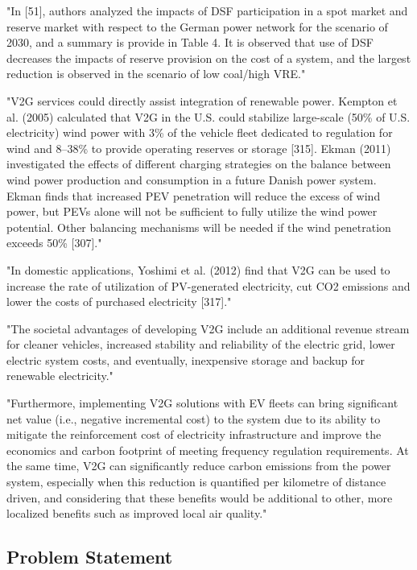 "In [51], authors analyzed the impacts of DSF participation in a spot market and reserve market with respect to the German power network for the scenario of 2030, and a summary is provide in Table 4. It is observed that use of DSF decreases the impacts of reserve provision on the cost of a system, and the largest reduction is observed in the scenario of low coal/high VRE." \cite{kaushik_comprehensive_2022}

"V2G services could directly assist integration of renewable power. Kempton et al. (2005) calculated that V2G in the U.S. could stabilize large-scale (50\% of U.S. electricity) wind power with 3\% of the vehicle fleet dedicated to regulation for wind and 8–38\% to provide operating reserves or storage [315]. Ekman (2011) investigated the effects of different charging strategies on the balance between wind power production and consumption in a future Danish power system. Ekman finds that increased PEV penetration will reduce the excess of wind power, but PEVs alone will not be sufficient to fully utilize the wind power potential. Other balancing mechanisms will be needed if the wind penetration exceeds 50\% [307]." \cite{lund_review_2015}

"In domestic applications, Yoshimi et al. (2012) find that V2G can be used to increase the rate of utilization of PV-generated electricity, cut CO2 emissions and lower the costs of purchased electricity [317]." \cite{lund_review_2015}

"The societal advantages of developing V2G include an additional revenue stream for cleaner vehicles, increased stability and reliability of the electric grid, lower electric system costs, and eventually, inexpensive storage and backup for renewable electricity." \cite{kempton_vehicle--grid_2005}

"Furthermore, implementing V2G solutions with EV fleets can bring significant net value (i.e., negative incremental cost) to the system due to its ability to mitigate the reinforcement cost of electricity infrastructure and improve the economics and carbon footprint of meeting frequency regulation requirements. At the same time, V2G can significantly reduce carbon emissions from the power system, especially when this reduction is quantified per kilometre of distance driven, and considering that these benefits would be additional to other, more localized benefits such as improved local air quality." \cite{aunedi_whole-system_2020}


\subsection{Problem Statement}

